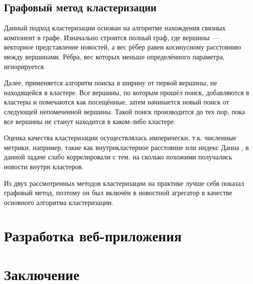 \documentclass[a4paper, 14pt]{extarticle}
\begin{document}
\subsection{Графовый метод кластеризации}
Данный подход кластеризации основан на алгоритме нахождения связных компонент в графе. Изначально строится полный граф,
где вершины~--- векторное представление новостей, а вес рёбер равен косинусному расстоянию между вершинами.
Рёбра, вес которых меньше определённого параметра, игнорируется.

Далее, применяется алгоритм поиска в ширину от первой вершины, не находящейся в кластере. Все вершины, по которым прошёл поиск, добавляются
в кластеры и помечаются как посещённые, затем начинается новый поиск от следующей непомеченной вершины.
Такой поиск производится до тех пор, пока все вершины не станут находится в каком-либо кластере.

Оценка качества кластеризации осуществлялась имперически, т.к. численные метрики, например, такие как внутрикластерное расстояние или
индекс Данна \cite{doi:10.1080/01969727308546046}, в данной задаче слабо коррелировали с тем, на сколько похожими получались новости внутри
кластеров. 

Из двух рассмотренных методов кластеризации на практике лучше себя показал графовый метод, поэтому он был включён в новостной агрегатор в качестве 
основного алгоритма кластеризации.
\section{Разработка веб-приложения}


\section{Заключение}


\setcounter{secnumdepth}{0}
\end{document}
